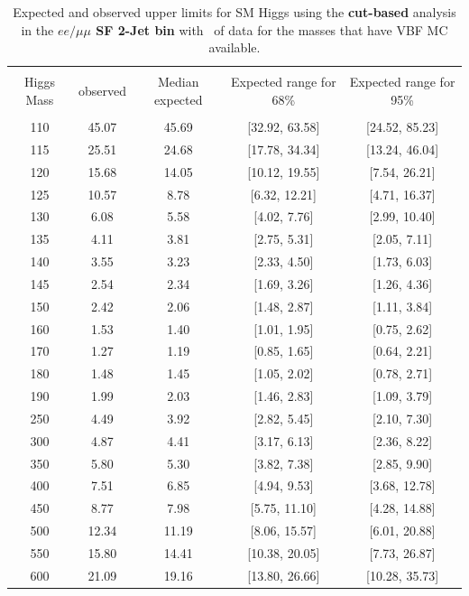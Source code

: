 \begin{table}[hbp!]
\begin{center}
\begin{tabular}{c c c c c}
\hline
\vspace{-3mm} && \\
 Higgs Mass & observed  & Median expected & Expected range for 68\% & Expected range for 95\%   \\
\vspace{-3mm} && \\
\hline
110 & 45.07 & 45.69 & [32.92, 63.58] & [24.52, 85.23] \\
115 & 25.51 & 24.68 & [17.78, 34.34] & [13.24, 46.04] \\
120 & 15.68 & 14.05 & [10.12, 19.55] & [7.54, 26.21] \\
125 & 10.57 & 8.78 & [6.32, 12.21] & [4.71, 16.37] \\
130 & 6.08 & 5.58 & [4.02, 7.76] & [2.99, 10.40] \\
135 & 4.11 & 3.81 & [2.75, 5.31] & [2.05, 7.11] \\
140 & 3.55 & 3.23 & [2.33, 4.50] & [1.73, 6.03] \\
145 & 2.54 & 2.34 & [1.69, 3.26] & [1.26, 4.36] \\
150 & 2.42 & 2.06 & [1.48, 2.87] & [1.11, 3.84] \\
160 & 1.53 & 1.40 & [1.01, 1.95] & [0.75, 2.62] \\
170 & 1.27 & 1.19 & [0.85, 1.65] & [0.64, 2.21] \\
180 & 1.48 & 1.45 & [1.05, 2.02] & [0.78, 2.71] \\
190 & 1.99 & 2.03 & [1.46, 2.83] & [1.09, 3.79] \\

250 & 4.49 & 3.92 & [2.82, 5.45] & [2.10, 7.30] \\
300 & 4.87 & 4.41 & [3.17, 6.13] & [2.36, 8.22] \\
350 & 5.80 & 5.30 & [3.82, 7.38] & [2.85, 9.90] \\
400 & 7.51 & 6.85 & [4.94, 9.53] & [3.68, 12.78] \\
450 & 8.77 & 7.98 & [5.75, 11.10] & [4.28, 14.88] \\
500 & 12.34 & 11.19 & [8.06, 15.57] & [6.01, 20.88] \\
550 & 15.80 & 14.41 & [10.38, 20.05] & [7.73, 26.87] \\
600 & 21.09 & 19.16 & [13.80, 26.66] & [10.28, 35.73] \\
\hline
\end{tabular}
\caption{Expected and observed upper limits for SM Higgs using the
  {\bf cut-based} analysis in the {\bf $ee/\mu\mu$ SF 2-Jet bin} with \intlumiEightTeV\ of data
 for the masses that have VBF MC available. }
\label{tab:cutbase_uls_2j}
\end{center}
\end{table}
\clearpage


